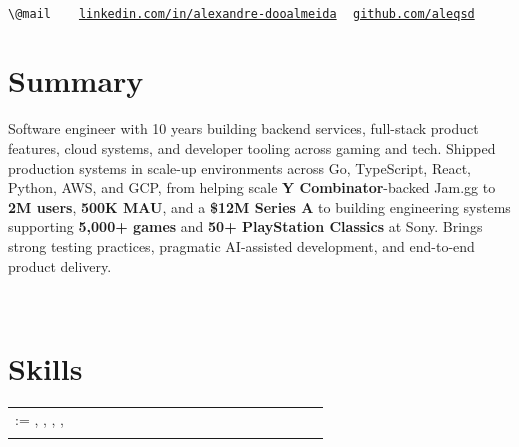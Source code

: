 \documentclass{muratcan_cv}
\makeatletter
\newcommand{\atscontactline}{%
    {\small
    \nolinkurl{\@mail} \ {\color{black}\textbar} \@address \ {\color{black}\textbar}
    \href{\@linkedinaccount}{\nolinkurl{linkedin.com/in/alexandre-dooalmeida}} \ {\color{black}\textbar}
    \href{\@githubaccount}{\nolinkurl{github.com/aleqsd}}}
}
\renewcommand\headerview{
    \hfill
    \begin{minipage}{0.94\linewidth}
        \vspace{2.6ex}
        \centering \name \\[0.14cm]
        \atscontactline \\
    \end{minipage}
    \hfill
}
\renewcommand{\explanationdetail}[1]{%
    \indent \indent \begin{minipage}{0.87\linewidth} \fontsize{8.35pt}{9.7pt}\selectfont #1 \end{minipage} \\[0.03cm]
}
\renewcommand\createskills[1]{%
    \explanationdetail{
        \scriptsize
        \setlength{\tabcolsep}{1.5pt}
        \begin{tabular}{>{\raggedright\arraybackslash}p{0.20\linewidth} >{\raggedright\arraybackslash}p{0.67\linewidth}}
            \@for\thisitem:=#1\do{\thisitem \\[0.03cm]}
        \end{tabular}
    }
}
\makeatother
\begin{document}
\headerview
\vspace{2.6ex}

\section{Summary}
\explanationdetail{
    Software engineer with 10 years building backend services, full-stack product features, cloud systems, and developer tooling across gaming and tech. Shipped production systems in scale-up environments across Go, TypeScript, React, Python, AWS, and GCP, from helping scale \textbf{Y Combinator}-backed Jam.gg to \textbf{2M users}, \textbf{500K MAU}, and a \textbf{\$12M Series A} to building engineering systems supporting \textbf{5,000+ games} and \textbf{50+ PlayStation Classics} at Sony. Brings strong testing practices, pragmatic AI-assisted development, and end-to-end product delivery.
}
\vspace{1.8ex}

\section{Skills}
\createskills{
    \createskill{Languages}{Python \cpshalf Go \cpshalf TypeScript \cpshalf Rust \cpshalf C++ \cpshalf Java \cpshalf Bash \cpshalf SQL \cpshalf Lua},
    \createskill{Frameworks}{React \cpshalf Node.js \cpshalf FastAPI \cpshalf Django \cpshalf Flask \cpshalf Ruby on Rails \cpshalf Unity},
    \createskill{Cloud / Platform}{AWS \cpshalf GCP \cpshalf Firebase \cpshalf GitHub Actions \cpshalf GitLab CI \cpshalf Docker \cpshalf Kubernetes},
    \createskill{AI / Tooling}{OpenAI \cpshalf Claude \cpshalf RAG (Pinecone) \cpshalf Google/Slack APIs \cpshalf Linear \cpshalf Figma},
    \createskill{Practices}{Backend \cpshalf Full-stack \cpshalf Product Delivery \cpshalf APIs \cpshalf Integrations \cpshalf Testing \cpshalf Agile}
}
\vspace{-0.1mm}
\end{document}
